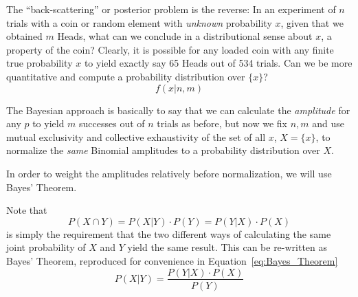 \documentclass[12pt]{report}
\newcommand{\beq}{\begin{equation}} %
\newcommand{\eeq}{\end{equation}} %
\newcommand{\bdm}{\begin{displaymath}} %
\newcommand{\edm}{\end{displaymath}} %
\begin{document}
The ``back-scattering'' or posterior problem is the reverse: In an experiment
of \(n\) trials with a coin or random element with {\it unknown}
probability \(x\), given that we obtained \(m\) Heads, what can we
conclude in a distributional sense about \(x\), a property of the
coin? Clearly, it is possible for any loaded coin with any finite true
probability \(x\) to yield exactly say 65 Heads out of 534 trials. Can
we be more quantitative and compute a probability distribution over
\(\{x\}\)?
\bdm
f(x|n,m)
\edm

The Bayesian approach is basically to say that we can calculate the
{\it amplitude} for any \(p\) to yield \(m\) successes out of \(n\)
trials as before, but now we fix \(n,m\) and use mutual exclusivity
and collective exhaustivity of the set of all \(x\), \(X =\{x\}\), to
normalize the {\it same} Binomial amplitudes to a probability
distribution over \(X\).   

In order to weight the amplitudes relatively before normalization, we
will use Bayes' Theorem.

Note that
\beq
P(X\cap Y)=P(X|Y)\cdot P(Y) = P(Y|X) \cdot P(X)
\eeq
is simply the requirement that the two different ways of calculating
the same joint
probability of \(X\) and \(Y\) yield the same result. This can be re-written
as Bayes'
Theorem, reproduced for convenience in Equation~\ref{eq:Bayes_Theorem}
\beq
\label{eq:Bayes_Theorem}
P(X|Y) = \frac{P(Y|X) \cdot P(X)}{P(Y)}
\eeq
\end{document}
